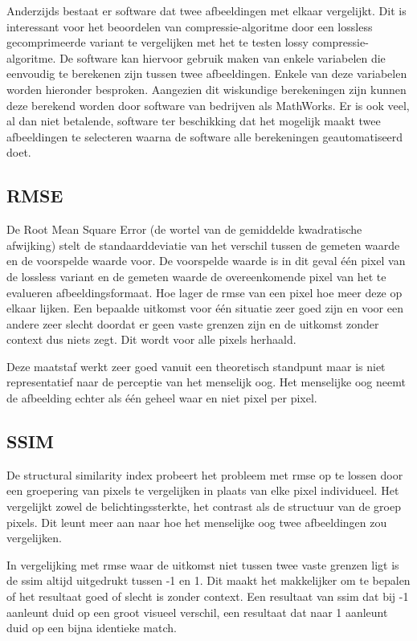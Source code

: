 Anderzijds bestaat er software dat twee afbeeldingen met elkaar vergelijkt. Dit is interessant voor het beoordelen van \gls{compressie-algoritme} door een \gls{lossless} gecomprimeerde variant te vergelijken met het te testen \gls{lossy} \gls{compressie-algoritme}. De software kan hiervoor gebruik maken van enkele variabelen die eenvoudig te berekenen zijn tussen twee afbeeldingen. Enkele van deze variabelen worden hieronder besproken. Aangezien dit wiskundige berekeningen zijn kunnen deze berekend worden door software van bedrijven als MathWorks. Er is ook veel, al dan niet betalende, software ter beschikking dat het mogelijk maakt twee afbeeldingen te selecteren waarna de software alle berekeningen geautomatiseerd doet.

\subsection{RMSE}
\label{sec:kwaliteit-rmse}

De Root Mean Square Error (de wortel van de gemiddelde kwadratische afwijking) stelt de standaarddeviatie van het verschil tussen de gemeten waarde en de voorspelde waarde voor. De voorspelde waarde is in dit geval één pixel van de \gls{lossless} variant en de gemeten waarde de overeenkomende pixel van het te evalueren \gls{afbeeldingsformaat}. Hoe lager de \gls{rmse} van een pixel hoe meer deze op elkaar lijken. Een bepaalde uitkomst voor één situatie zeer goed zijn en voor een andere zeer slecht doordat er geen vaste grenzen zijn en de uitkomst zonder context dus niets zegt. Dit wordt voor alle pixels herhaald. 

Deze maatstaf werkt zeer goed vanuit een theoretisch standpunt maar is niet representatief naar de perceptie van het menselijk oog. Het menselijke oog neemt de afbeelding echter als één geheel waar en niet pixel per pixel.

\subsection{SSIM}
\label{sec:kwaliteit-ssim}

De structural similarity index probeert het probleem met \gls{rmse} op te lossen door een groepering van pixels te vergelijken in plaats van elke pixel individueel. Het vergelijkt zowel de belichtingssterkte, het contrast als de structuur van de groep pixels. Dit leunt meer aan naar hoe het menselijke oog twee afbeeldingen zou vergelijken.

In vergelijking met \gls{rmse} waar de uitkomst niet tussen twee vaste grenzen ligt is de \gls{ssim} altijd uitgedrukt tussen -1 en 1. Dit maakt het makkelijker om te bepalen of het resultaat goed of slecht is zonder context. Een resultaat van \gls{ssim} dat bij -1 aanleunt duid op een groot visueel verschil, een resultaat dat naar 1 aanleunt duid op een bijna identieke match.

